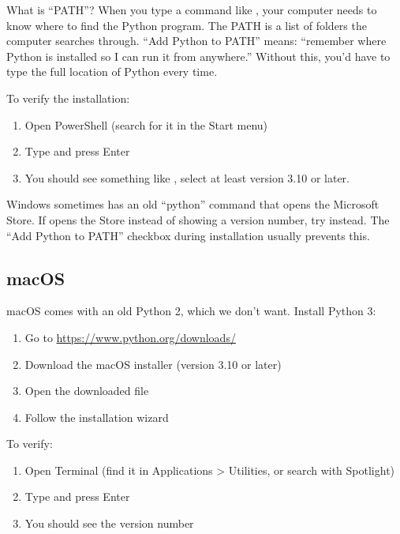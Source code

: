 \begin{note}
What is ``PATH''? When you type a command like , your computer needs to know where to find the Python program. The PATH is a list of folders the computer searches through. ``Add Python to PATH'' means: ``remember where Python is installed so I can run it from anywhere.'' Without this, you'd have to type the full location of Python every time.
\end{note}

To verify the installation:
\begin{enumerate}
    \item Open PowerShell (search for it in the Start menu)
    \item Type  and press Enter
    \item You should see something like , select at least version 3.10 or later.
\end{enumerate}

\begin{warning}
Windows sometimes has an old ``python'' command that opens the Microsoft Store. If  opens the Store instead of showing a version number, try  instead. The ``Add Python to PATH'' checkbox during installation usually prevents this.
\end{warning}

\subsection{macOS}

macOS comes with an old Python 2, which we don't want. Install Python 3:

\begin{enumerate}
    \item Go to \url{https://www.python.org/downloads/}
    \item Download the macOS installer (version 3.10 or later)
    \item Open the downloaded  file
    \item Follow the installation wizard
\end{enumerate}

To verify:
\begin{enumerate}
    \item Open Terminal (find it in Applications > Utilities, or search with Spotlight)
    \item Type  and press Enter
    \item You should see the version number
\end{enumerate}

